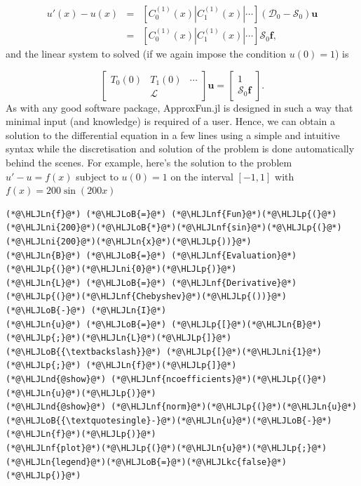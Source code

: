 \documentclass[12pt,a4paper]{article}
\newcommand{\HLJLkc}[1]{\textcolor[RGB]{59,151,46}{\textit{#1}}}
\newcommand{\HLJLn}[1]{#1}
\newcommand{\HLJLnd}[1]{\textcolor[RGB]{214,102,97}{#1}}
\newcommand{\HLJLnf}[1]{\textcolor[RGB]{66,102,213}{#1}}
\newcommand{\HLJLni}[1]{\textcolor[RGB]{59,151,46}{#1}}
\newcommand{\HLJLoB}[1]{\textcolor[RGB]{102,102,102}{\textbf{#1}}}
\newcommand{\HLJLp}[1]{#1}
\begin{document}
\begin{eqnarray*}
u'(x)-u(x) &=&  \left[ C_0^{(1)}(x) | C_1^{(1)}(x) | \cdots \right]\left(\mathcal{D}_0 - \mathcal{S}_0\right)\mathbf{u}\\
 &=& \left[ C_0^{(1)}(x) | C_1^{(1)}(x) | \cdots \right]\mathcal{S}_0\mathbf{f},
\end{eqnarray*}
and the linear system to solved (if we again impose the condition $u(0) = 1$) is

\[
\begin{bmatrix}
T_0(0) & T_1(0) & \cdots  \\
 &\mathcal{L} &
\end{bmatrix}\mathbf{u} = \begin{bmatrix} 1 \\
\mathcal{S}_0\mathbf{f}
\end{bmatrix}.
\]
As with any good software package, ApproxFun.jl is designed in such a way that minimal input (and knowledge) is required of a user.  Hence, we can obtain a solution to the differential equation  in a few lines using a simple and intuitive syntax while the discretisation and solution of the problem is done automatically behind the scenes.  For example, here's the solution to the problem $u' - u = f(x)$ subject to $u(0) = 1$ on the interval $[-1, 1]$ with $f(x) = 200\sin(200x)$


\begin{lstlisting}
(*@\HLJLn{f}@*) (*@\HLJLoB{=}@*) (*@\HLJLnf{Fun}@*)(*@\HLJLp{(}@*)(*@\HLJLni{200}@*)(*@\HLJLoB{*}@*)(*@\HLJLnf{sin}@*)(*@\HLJLp{(}@*)(*@\HLJLni{200}@*)(*@\HLJLn{x}@*)(*@\HLJLp{))}@*)
(*@\HLJLn{B}@*) (*@\HLJLoB{=}@*) (*@\HLJLnf{Evaluation}@*)(*@\HLJLp{(}@*)(*@\HLJLni{0}@*)(*@\HLJLp{)}@*)
(*@\HLJLn{L}@*) (*@\HLJLoB{=}@*) (*@\HLJLnf{Derivative}@*)(*@\HLJLp{(}@*)(*@\HLJLnf{Chebyshev}@*)(*@\HLJLp{())}@*) (*@\HLJLoB{-}@*) (*@\HLJLn{I}@*)
(*@\HLJLn{u}@*) (*@\HLJLoB{=}@*) (*@\HLJLp{[}@*)(*@\HLJLn{B}@*)(*@\HLJLp{;}@*)(*@\HLJLn{L}@*)(*@\HLJLp{]}@*) (*@\HLJLoB{{\textbackslash}}@*) (*@\HLJLp{[}@*)(*@\HLJLni{1}@*)(*@\HLJLp{;}@*) (*@\HLJLn{f}@*)(*@\HLJLp{]}@*)
(*@\HLJLnd{@show}@*) (*@\HLJLnf{ncoefficients}@*)(*@\HLJLp{(}@*)(*@\HLJLn{u}@*)(*@\HLJLp{)}@*)
(*@\HLJLnd{@show}@*) (*@\HLJLnf{norm}@*)(*@\HLJLp{(}@*)(*@\HLJLn{u}@*)(*@\HLJLoB{{\textquotesingle}-}@*)(*@\HLJLn{u}@*)(*@\HLJLoB{-}@*)(*@\HLJLn{f}@*)(*@\HLJLp{)}@*)
(*@\HLJLnf{plot}@*)(*@\HLJLp{(}@*)(*@\HLJLn{u}@*)(*@\HLJLp{;}@*)(*@\HLJLn{legend}@*)(*@\HLJLoB{=}@*)(*@\HLJLkc{false}@*)(*@\HLJLp{)}@*)
\end{lstlisting}
\end{document}
